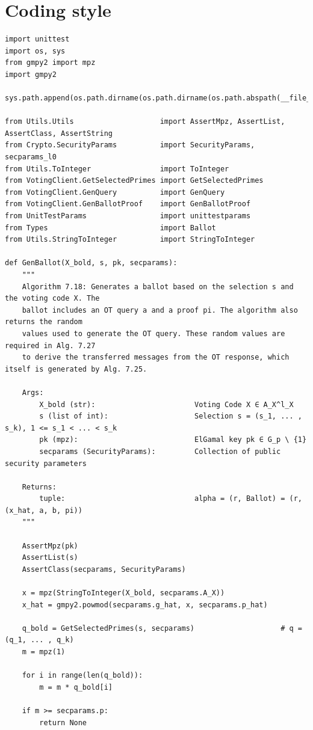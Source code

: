 \documentclass[a4paper,12pt]{report}
\theoremstyle{definition}
\begin{document}
\section{Coding style}
\begin{verbatim}
import unittest
import os, sys
from gmpy2 import mpz
import gmpy2

sys.path.append(os.path.dirname(os.path.dirname(os.path.abspath(__file__))))

from Utils.Utils                    import AssertMpz, AssertList, AssertClass, AssertString
from Crypto.SecurityParams          import SecurityParams, secparams_l0
from Utils.ToInteger                import ToInteger
from VotingClient.GetSelectedPrimes import GetSelectedPrimes
from VotingClient.GenQuery          import GenQuery
from VotingClient.GenBallotProof    import GenBallotProof
from UnitTestParams                 import unittestparams
from Types                          import Ballot
from Utils.StringToInteger          import StringToInteger

def GenBallot(X_bold, s, pk, secparams):
    """
    Algorithm 7.18: Generates a ballot based on the selection s and the voting code X. The
    ballot includes an OT query a and a proof pi. The algorithm also returns the random
    values used to generate the OT query. These random values are required in Alg. 7.27
    to derive the transferred messages from the OT response, which itself is generated by Alg. 7.25.

    Args:
        X_bold (str):                       Voting Code X ∈ A_X^l_X
        s (list of int):                    Selection s = (s_1, ... , s_k), 1 <= s_1 < ... < s_k
        pk (mpz):                           ElGamal key pk ∈ G_p \ {1}
        secparams (SecurityParams):         Collection of public security parameters

    Returns:
        tuple:                              alpha = (r, Ballot) = (r, (x_hat, a, b, pi))
    """

    AssertMpz(pk)
    AssertList(s)
    AssertClass(secparams, SecurityParams)

    x = mpz(StringToInteger(X_bold, secparams.A_X))
    x_hat = gmpy2.powmod(secparams.g_hat, x, secparams.p_hat)

    q_bold = GetSelectedPrimes(s, secparams)                    # q = (q_1, ... , q_k)
    m = mpz(1)

    for i in range(len(q_bold)):
        m = m * q_bold[i]

    if m >= secparams.p:
        return None


\end{verbatim}
\end{document}

